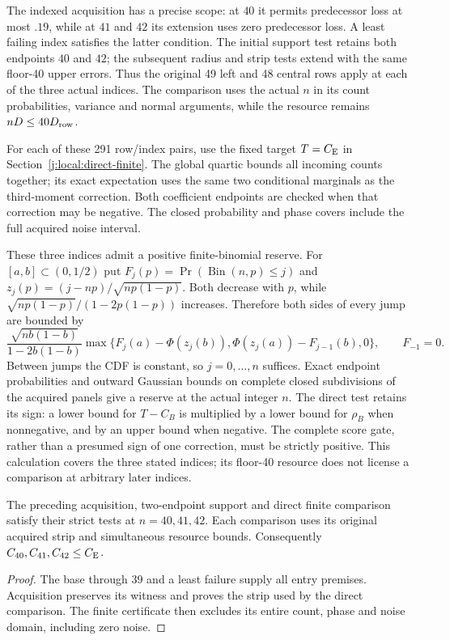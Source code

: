 The indexed acquisition has a precise scope: at $40$ it permits
predecessor loss at most $.19$, while at $41$ and $42$ its extension
uses zero predecessor loss. A least failing index satisfies the latter
condition. The initial support test retains both endpoints $40$ and $42$;
the subsequent radius and strip tests extend with the same floor-40
upper errors. Thus the original 49 left and 48 central rows apply at
each of the three actual indices. The comparison uses the actual $n$
in its count probabilities, variance and normal arguments, while the
resource remains $nD\le40D_{\rm row}$.

For each of these 291 row/index pairs, use the fixed target $T=C_{\mathrm E}$
in Section~\ref{j:local:direct-finite}. The global quartic bounds all
incoming counts together; its exact expectation uses the same two
conditional marginals as the third-moment correction. Both coefficient
endpoints are checked when that correction may be negative. The closed
probability and phase covers include the full acquired noise interval.

These three indices admit a positive finite-binomial reserve. For
$[a,b]\subset(0,1/2)$ put
$F_j(p)=\Pr(\operatorname{Bin}(n,p)\le j)$ and
$z_j(p)=(j-np)/\sqrt{np(1-p)}$. Both decrease with $p$, while
$\sqrt{np(1-p)}/(1-2p(1-p))$ increases. Therefore both sides of
every jump are bounded by
\begin{equation}\label{j:finite:binomialslack}
 \frac{\sqrt{nb(1-b)}}{1-2b(1-b)}
 \max\{F_j(a)-\Phi(z_j(b)),\Phi(z_j(a))-F_{j-1}(b),0\},
 \qquad F_{-1}=0.
\end{equation}
Between jumps the CDF is constant, so $j=0,\ldots,n$ suffices.
Exact endpoint probabilities and outward Gaussian bounds on complete
closed subdivisions of the acquired panels give a reserve at the actual
integer $n$. The direct test retains its sign: a lower bound for
$T-C_B$ is multiplied by a lower bound for $\rho_B$ when nonnegative,
and by an upper bound when negative. The complete score gate, rather
than a presumed sign of one correction, must be strictly positive.
This calculation covers the three stated indices; its floor-40 resource
does not license a comparison at arbitrary later indices.

\begin{proposition}\label{j:finite:numerical4042}
The preceding acquisition, two-endpoint support and direct finite
comparison satisfy their strict tests at $n=40,41,42$. Each comparison
uses its original acquired strip and simultaneous resource bounds.
Consequently $C_{40},C_{41},C_{42}\le C_{\mathrm E}$.
\end{proposition}
\begin{proof}
The base through 39 and a least failure supply all entry premises.
Acquisition preserves its witness and proves the strip used by the
direct comparison. The finite certificate then excludes its entire
count, phase and noise domain, including zero noise.
\end{proof}

